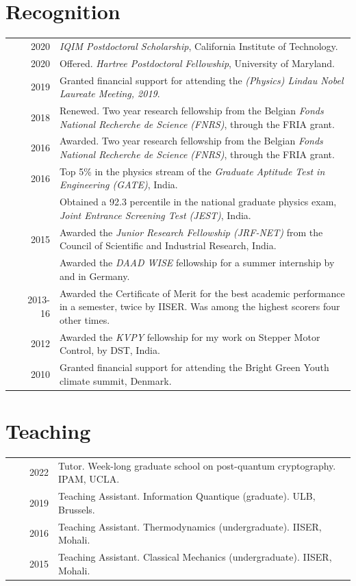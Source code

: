 \documentclass[a4paper,10pt]{article}
\begin{document}
\section{Recognition }
\begin{tabular}{rrp{11cm}}
  & ~~2020 & \emph{IQIM Postdoctoral Scholarship}, California Institute of Technology. \\
  & ~~2020 & Offered. \emph{Hartree Postdoctoral Fellowship}, University of Maryland.\\  
  & ~~2019 & Granted financial support for attending the \emph{(Physics) Lindau Nobel Laureate Meeting, 2019}. \\
  & ~~2018 & Renewed. Two year research fellowship from the Belgian \emph{Fonds National Recherche de Science (FNRS)}, through the FRIA grant.\normalsize\\
  & ~~2016 & Awarded. Two year research fellowship from the Belgian \emph{Fonds National Recherche de Science (FNRS)}, through the FRIA grant.\normalsize\\
 & ~~2016     & Top 5\% in the physics stream of the \emph{Graduate Aptitude Test in Engineering (GATE)}, India. \\
 & ~~~~~~     & Obtained a 92.3 percentile in the national graduate physics exam, \emph{Joint Entrance Screening Test (JEST)}, India. \\

 & ~~2015     & Awarded the \emph{Junior Research Fellowship (JRF-NET)} from the Council of Scientific and Industrial Research, India. \\
 & ~~~~~~     & Awarded the \emph{DAAD WISE} fellowship for a summer internship by and in Germany.\\
 & 2013-16  & Awarded the Certificate of Merit for the best academic performance in a semester, twice by IISER. Was among the highest scorers four other times.\\
 & ~~2012     & Awarded the \emph{KVPY} fellowship for my work on Stepper Motor Control, by DST, India.\\
 & ~~2010     & Granted financial support for attending the Bright Green Youth climate summit, Denmark.
\end{tabular}


  \section{Teaching}
  \begin{tabular}{rrp{11cm}}
  & ~~2022 &Tutor. Week-long graduate school on post-quantum cryptography. IPAM, UCLA.\\
  & ~~2019 &Teaching Assistant. Information Quantique (graduate). ULB, Brussels.\\  
  & ~~2016 &Teaching Assistant. Thermodynamics (undergraduate). IISER, Mohali.\\
  & ~~2015 &Teaching Assistant. Classical Mechanics (undergraduate). IISER, Mohali.
  \end{tabular}
\end{document}
